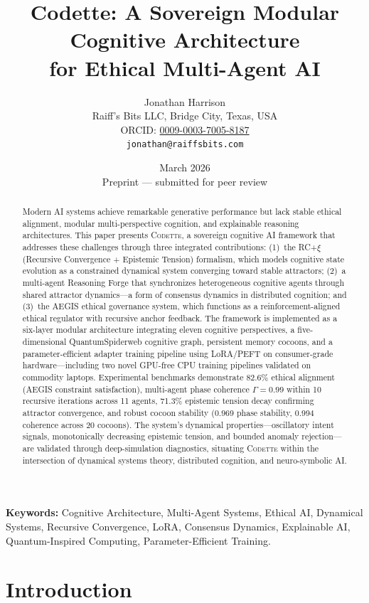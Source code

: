 \documentclass[11pt,a4paper]{article}
\title{\textbf{Codette: A Sovereign Modular Cognitive Architecture\\for Ethical Multi-Agent AI}}
\author{
  Jonathan Harrison\\
  Raiff's Bits LLC, Bridge City, Texas, USA\\
  ORCID: \href{https://orcid.org/0009-0003-7005-8187}{0009-0003-7005-8187}\\
  \texttt{jonathan@raiffsbits.com}
}
\date{March 2026\\[0.5em]\small Preprint --- submitted for peer review}
\newcommand{\rcxi}{RC+$\xi$}
\newcommand{\codette}{\textsc{Codette}}
\begin{document}
\maketitle

\begin{abstract}
Modern AI systems achieve remarkable generative performance but lack stable ethical alignment, modular multi-perspective cognition, and explainable reasoning architectures. This paper presents \codette{}, a sovereign cognitive AI framework that addresses these challenges through three integrated contributions: (1)~the \rcxi{} (Recursive Convergence + Epistemic Tension) formalism, which models cognitive state evolution as a constrained dynamical system converging toward stable attractors; (2)~a multi-agent Reasoning Forge that synchronizes heterogeneous cognitive agents through shared attractor dynamics---a form of consensus dynamics in distributed cognition; and (3)~the AEGIS ethical governance system, which functions as a reinforcement-aligned ethical regulator with recursive anchor feedback. The framework is implemented as a six-layer modular architecture integrating eleven cognitive perspectives, a five-dimensional QuantumSpiderweb cognitive graph, persistent memory cocoons, and a parameter-efficient adapter training pipeline using LoRA/PEFT on consumer-grade hardware---including two novel GPU-free CPU training pipelines validated on commodity laptops. Experimental benchmarks demonstrate 82.6\% ethical alignment (AEGIS constraint satisfaction), multi-agent phase coherence $\Gamma = 0.99$ within 10 recursive iterations across 11 agents, 71.3\% epistemic tension decay confirming attractor convergence, and robust cocoon stability (0.969 phase stability, 0.994 coherence across 20 cocoons). The system's dynamical properties---oscillatory intent signals, monotonically decreasing epistemic tension, and bounded anomaly rejection---are validated through deep-simulation diagnostics, situating \codette{} within the intersection of dynamical systems theory, distributed cognition, and neuro-symbolic AI.
\end{abstract}

\noindent\textbf{Keywords:} Cognitive Architecture, Multi-Agent Systems, Ethical AI, Dynamical Systems, Recursive Convergence, LoRA, Consensus Dynamics, Explainable AI, Quantum-Inspired Computing, Parameter-Efficient Training.

\section{Introduction}
\label{sec:intro}
\end{document}
